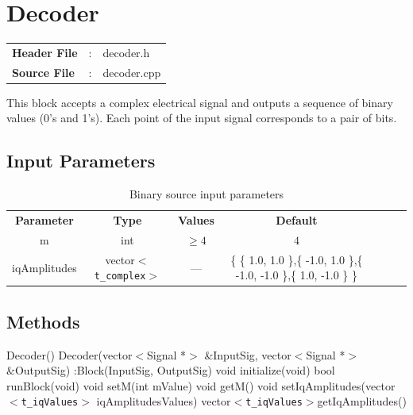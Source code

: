 \clearpage

\section{Decoder}

\begin{tcolorbox}	
	\begin{tabular}{p{2.75cm} p{0.2cm} p{10.5cm}} 	
		\textbf{Header File}   &:& decoder.h \\
		\textbf{Source File}   &:& decoder.cpp \\
	\end{tabular}
\end{tcolorbox}


This block accepts a complex electrical signal and outputs a sequence of binary values (0's and 1's). Each point of the input signal corresponds to a pair of bits.

\subsection*{Input Parameters}



\begin{table}[h]
	\centering
	\begin{tabular}{|c|c|c|c|ccp{60mm}}
		\cline{1-4}
		\textbf{Parameter} & \textbf{Type} & \textbf{Values} &   \textbf{Default}& \\ \cline{1-4}
		m & int & $\geq 4$ & $4$ \\ \cline{1-4}
		iqAmplitudes & vector$<$\texttt{t\_complex}$>$ & \---- & \{ \{ 1.0, 1.0 \},\{ -1.0, 1.0 \},\{ -1.0, -1.0 \},\{ 1.0, -1.0 \} \} \\ \cline{1-4}
	\end{tabular}
	\caption{Binary source input parameters}
	\label{table:decoder_in_par}
\end{table}

\subsection*{Methods}

Decoder() {}
\bigbreak
Decoder(vector$<$Signal *$>$ \&InputSig, vector$<$Signal *$>$ \&OutputSig) :Block(InputSig, OutputSig) {}
\bigbreak
void initialize(void)
\bigbreak
bool runBlock(void)
\bigbreak
void setM(int mValue)
\bigbreak
void getM()
\bigbreak
void setIqAmplitudes(vector$<$\texttt{t\_iqValues}$>$ iqAmplitudesValues)
\bigbreak
vector$<$\texttt{t\_iqValues}$>$getIqAmplitudes()

